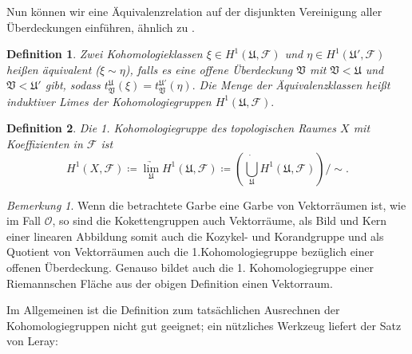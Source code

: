 \documentclass[11pt,a4paper,toc=bibliography]{scrartcl}
\theoremstyle{def}
\newtheorem{defi}{Definition}[section]
\theoremstyle{thm}
\theoremstyle{remark}
\newtheorem*{bem}{Bemerkung}
\begin{document}
Nun können wir eine Äquivalenzrelation auf der disjunkten Vereinigung aller Überdeckungen einführen, ähnlich zu .
\begin{defi}
	Zwei Kohomologieklassen $\xi\in H^1(\mathfrak{U},\mathcal{F})$ und $\eta\in H^1(\mathfrak{U'},\mathcal{F})$ heißen äquivalent ($\xi\sim\eta$), falls es eine offene Überdeckung $\mathfrak{V}$ mit $\mathfrak{V}<\mathfrak{U}$ und $\mathfrak{V}< \mathfrak{U'}$ gibt, sodass $t^{\mathfrak{U}}_{\mathfrak{V}}(\xi)=t^{\mathfrak{U'}}_{\mathfrak{V}}(\eta).$
	Die Menge der Äquivalenzklassen heißt \emph{induktiver Limes} der Kohomologiegruppen $H^1(\mathfrak{U},\mathcal{F}).$
\end{defi}
\begin{defi}
Die \emph{1. Kohomologiegruppe} des topologischen Raumes $X$ mit Koeffizienten in $\mathcal{F}$ ist
$$
H^1(X,\mathcal{F}) \coloneqq \underset{\mathfrak{U}}{\underrightarrow{\lim}} H^1(\mathfrak{U},\mathcal{F})\coloneqq \left( \dot{\bigcup_{\mathfrak{U}}} H^1(\mathfrak{U},\mathcal{F})\right) /\sim.
$$
\end{defi}
\begin{bem}
Wenn die betrachtete Garbe eine Garbe von Vektorräumen ist, wie im Fall $\mathcal{O}$, so sind die Kokettengruppen auch Vektorräume, als Bild und Kern einer linearen Abbildung somit auch die Kozykel- und Korandgruppe und als Quotient von Vektorräumen auch die 1.Kohomologiegruppe bezüglich einer offenen Überdeckung. Genauso bildet auch die 1. Kohomologiegruppe einer Riemannschen Fläche aus der obigen Definition einen Vektorraum.
\end{bem}
Im Allgemeinen ist die Definition zum tatsächlichen Ausrechnen der Kohomologiegruppen nicht gut geeignet; ein nützliches Werkzeug liefert der Satz von Leray:
\end{document}
